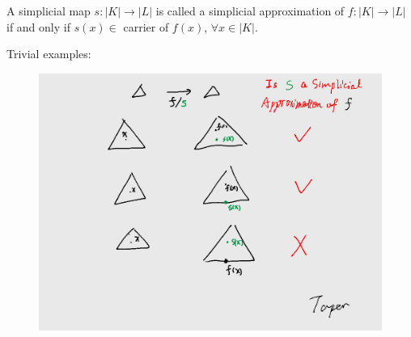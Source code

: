 \begin{defi}
    A simplicial map $s:|K|\to |L|$ is called a simplicial approximation of
    $f:|K|\to |L|$ if and only if $s(x)\in$ carrier of $f(x)$,
    $\forall x\in |K|$.
\end{defi}
\begin{ex}
    Trivial examples:
\begin{figure}[H]
    \centering
    \includegraphics[width=0.8\linewidth]{pics/ch6-notes-2/ex3.png}
\end{figure}
\end{ex}
